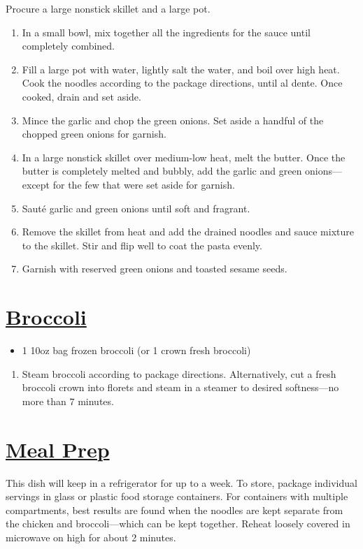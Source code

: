 \documentclass{article}
\begin{document}
\begin{minipage}{\textwidth}
\begin{vwcol}[widths={0.6,0.4}, rule=0pt]
\begin{minipage}{0.55\textwidth}
\instructions
Procure a large nonstick skillet and a large pot.
\begin{enumerate}
    \item In a small bowl, mix together all the ingredients for the sauce until completely combined.
    \item Fill a large pot with water, lightly salt the water, and boil over high heat. Cook the noodles according to the package directions, until al dente. Once cooked, drain and set aside.
    \item Mince the garlic and chop the green onions. Set aside a handful of the chopped green onions for garnish.
    \item In a large nonstick skillet over medium-low heat, melt the butter. Once the butter is completely melted and bubbly, add the garlic and green onions---except for the few that were set aside for garnish.
    \item Sauté garlic and green onions until soft and fragrant.
    \item Remove the skillet from heat and add the drained noodles and sauce mixture to the skillet. Stir and flip well to coat the pasta evenly.
    \item Garnish with reserved green onions and toasted sesame seeds.
\end{enumerate}
\end{minipage}

\newpage
\begin{minipage}{0.3\linewidth}
\section*{\underline{Broccoli}}
\ingredients
\vspace{-1em}
\begin{itemize}
    \item 1 10oz bag frozen broccoli (or 1 crown fresh broccoli)
\end{itemize}
\vspace{1em}

\instructions
\vspace{-1em}
\begin{enumerate}
    \item Steam broccoli according to package directions. Alternatively, cut a fresh broccoli crown into florets and steam in a steamer to desired softness---no more than $7$ minutes.
\end{enumerate}

\section*{\underline{Meal Prep}}
This dish will keep in a refrigerator for up to a week. To store, package individual servings in glass or plastic food storage containers. For containers with multiple compartments, best results are found when the noodles are kept separate from the chicken and broccoli---which can be kept together. Reheat loosely covered in microwave on high for about 2 minutes.
\end{minipage}
\end{vwcol}
\end{minipage}
\end{document}
